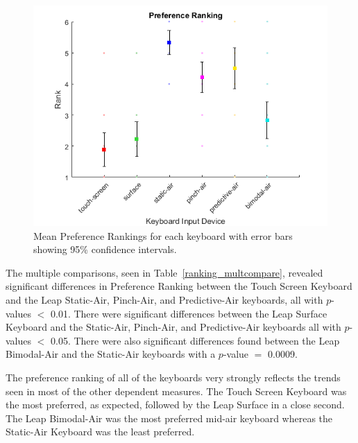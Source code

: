 \begin{figure}[h]
	\centering
	\includegraphics{fig_ranking_mean}
	\caption[Mean Preference Rankings]{Mean Preference Rankings for each keyboard with error bars showing 95\% confidence intervals.}
	\label{fig_ranking_mean}
\end{figure}

The multiple comparisons, seen in Table~\ref{ranking_multcompare}, revealed significant differences in Preference Ranking between the Touch Screen Keyboard and the Leap Static-Air, Pinch-Air, and Predictive-Air keyboards, all with $p$-values $<$ 0.01. There were significant differences between the Leap Surface Keyboard and the Static-Air, Pinch-Air, and Predictive-Air keyboards all with $p$-values $<$ 0.05. There were also significant differences found between the Leap Bimodal-Air and the Static-Air keyboards with a $p$-value $=$ 0.0009.

The preference ranking of all of the keyboards very strongly reflects the trends seen in most of the other dependent measures. The Touch Screen Keyboard was the most preferred, as expected, followed by the Leap Surface in a close second. The Leap Bimodal-Air was the most preferred mid-air keyboard whereas the Static-Air Keyboard was the least preferred.